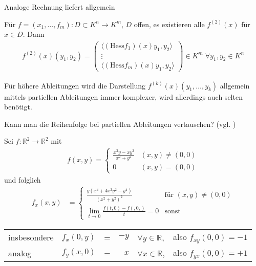 Analoge Rechnung liefert allgemein
\begin{conclusion}
	Für $f=(x_1, \dotsc, f_m):D\subset K^n\to K^m$, $D$ offen, es existieren alle $f^{(2)}(x)$ für $x\in D$. Dann \begin{align}
		f^{(2)}(x) (y_1,y_2) = \begin{pmatrix}
			\langle (\mathrm{Hess} f_1)(x) y_1, y_2\rangle \\ 
			\vdots\\
			\langle (\mathrm{Hess} f_m)(x) y_1,y_2\rangle
		\end{pmatrix} \in K^m\; \forall y_1, y_2\in K^n
	\end{align}
\end{conclusion}

\begin{remark}
	Für höhere Ableitungen wird die Darstellung $f^{(k)}(x)(y_1, \dotsc, y_k)$ allgemein mittels partiellen Ableitungen immer komplexer, wird allerdings auch selten benötigt.
\end{remark}

\begin{boldenvironment}[Frage:]
	Kann man die Reihenfolge bei partiellen Ableitungen vertauschen? (vgl. )
\end{boldenvironment}

\begin{example}
	Sei $f:\mathbb{R}^2\to\mathbb{R}^2$ mit\begin{align*}
		f(x,y) = \begin{cases}
			\frac{x^3y - xy^3}{x^2+y^2} & (x,y)\neq(0,0)\\
			0 & (x,y)=(0,0)
		\end{cases}
	\end{align*}
	und folglich \begin{align*}
		f_x(x,y) &= \begin{cases}
			\frac{y(x^4 + 4x^2 y^2 - y^4)}{(x^2 + y^2)^2} & \text{für }(x,y) \neq (0,0) \\
			\lim\limits_{t\to 0}\frac{f(t,0) - f(,0,)}{t} = 0 & \text{sonst}
		\end{cases}
	\end{align*}
	\begin{tabularx}{\linewidth}{l@{\ }l@{\ }c@{\ }r@{\ }l@{\ }X}
		
	insbesondere & $f_x(0,y)$ &=& $-y$& $\forall y\in \mathbb{R}$,& also $f_{xy}(0,0) = -1$ \\
	analog & $f_y(x,0)$ &=& $x$ & $\forall x\in\mathbb{R}$,& also $f_{yx}(0,0) = +1$
	\end{tabularx}
\end{example}

